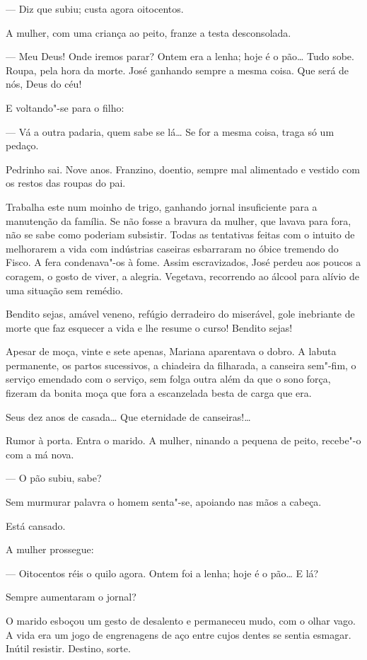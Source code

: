 --- Diz que subiu; custa agora oitocentos.

A mulher, com uma criança ao peito, franze a testa desconsolada.

--- Meu Deus! Onde iremos parar? Ontem era a lenha; hoje é o pão\ldots{} Tudo
sobe. Roupa, pela hora da morte. José ganhando sempre a mesma coisa. Que
será de nós, Deus do céu!

E voltando"-se para o filho:

--- Vá a outra padaria, quem sabe se lá\ldots{} Se for a mesma coisa, traga
só um pedaço.

Pedrinho sai. Nove anos. Franzino, doentio, sempre mal alimentado e
vestido com os restos das roupas do pai.

Trabalha este num moinho de trigo, ganhando jornal insuficiente para a
manutenção da família. Se não fosse a bravura da mulher, que lavava para
fora, não se sabe como poderiam subsistir. Todas as tentativas feitas
com o intuito de melhorarem a vida com indústrias caseiras esbarraram no
óbice tremendo do Fisco. A fera condenava"-os à fome. Assim escravizados,
José perdeu aos poucos a coragem, o gosto de viver, a alegria. Vegetava,
recorrendo ao álcool para alívio de uma situação sem remédio.

Bendito sejas, amável veneno, refúgio derradeiro do miserável, gole
inebriante de morte que faz esquecer a vida e lhe resume o curso!
Bendito sejas!

Apesar de moça, vinte e sete apenas, Mariana aparentava o dobro. A
labuta permanente, os partos sucessivos, a chiadeira da filharada, a
canseira sem"-fim, o serviço emendado com o serviço, sem folga outra além
da que o sono força, fizeram da bonita moça que fora a escanzelada besta
de carga que era.

Seus dez anos de casada\ldots{} Que eternidade de canseiras!\ldots{}

Rumor à porta. Entra o marido. A mulher, ninando a pequena de peito,
recebe"-o com a má nova.

--- O pão subiu, sabe?

Sem murmurar palavra o homem senta"-se, apoiando nas mãos a cabeça.

Está cansado.

A mulher prossegue:

--- Oitocentos réis o quilo agora. Ontem foi a lenha; hoje é o pão\ldots{} E
lá?

Sempre aumentaram o jornal?

O marido esboçou um gesto de desalento e permaneceu mudo, com o olhar
vago. A vida era um jogo de engrenagens de aço entre cujos dentes se
sentia esmagar. Inútil resistir. Destino, sorte.

